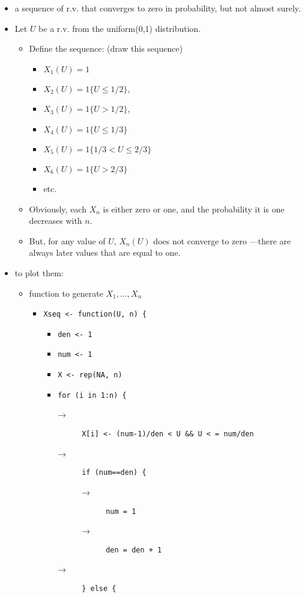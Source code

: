 \documentclass[11pt]{article}
\begin{document}
\begin{itemize}
\item a sequence of r.v. that converges to zero in probability, but
        not almost surely.
\item Let $U$ be a r.v. from the uniform(0,1) distribution.
\begin{itemize}
\item Define the sequence: (draw this sequence)
\begin{itemize}
\item $X_1(U) = 1$
\item $X_2(U) = 1\{U \leq 1/2\}$,
\item $X_3(U) = 1\{U > 1/2\}$,
\item $X_4(U) = 1\{U \leq 1/3\}$
\item $X_5(U) = 1\{1/3 < U \leq 2/3\}$
\item $X_6(U) = 1\{U > 2/3\}$
\item etc.
\end{itemize}
\item Obviously, each $X_n$ is either zero or one, and the
          probability it is one decreases with $n$.
\item But, for any value of $U$, $X_n(U)$ does not converge to zero
          ---there are always later values that are equal to one.
\end{itemize}
\item to plot them:
\begin{itemize}
\item function to generate $X_1,\dots,X_n$
\begin{itemize}
\item \texttt{Xseq <- function(U, n) \{}
\begin{itemize}
\item \texttt{den <- 1}
\item \texttt{num <- 1}
\item \texttt{X <- rep(NA, n)}
\item \texttt{for (i in 1:n) \{}
  \begin{description}
  \item[→] \texttt{X[i] <- (num-1)/den < U \&\& U < = num/den}
  \item[→] \texttt{if (num==den) \{}
    \begin{description}
    \item[→] \texttt{num = 1}
    \item[→] \texttt{den = den + 1}
    \end{description}
  \item[→] \texttt{\} else \{}

\end{description}
\end{itemize}
\end{itemize}
\end{itemize}
\end{itemize}
\end{document}
